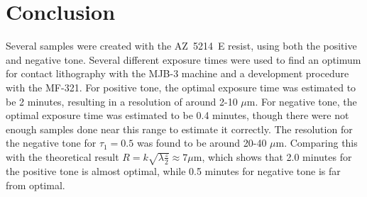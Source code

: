 \section*{Conclusion}
Several samples were created with the AZ~5214~E resist, using both the positive and negative tone. Several different exposure times were used to find an optimum for contact lithography with the MJB-3 machine and a development procedure with the MF-321. For positive tone, the optimal exposure time was estimated to be 2 minutes, resulting in a resolution of around 2-10 $\mu$m. For negative tone, the optimal exposure time was estimated to be 0.4 minutes, though there were not enough samples done near this range to estimate it correctly. The resolution for the negative tone for $\tau_1 = 0.5$ was found to be around 20-40 $\mu$m. Comparing this with the theoretical result $R = k \sqrt{\lambda\frac{z}{2}} \approx 7 \mu$m, which shows that 2.0 minutes for the positive tone is almost optimal, while 0.5 minutes for negative tone is far from optimal.
